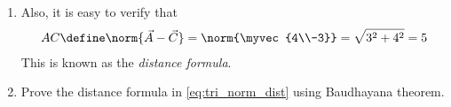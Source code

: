 \begin{enumerate}[label=\arabic*.,ref=\thesubsection.\theenumi]
\item Also, it is easy to verify that
%
\begin{align}
\label{eq:tri_norm_dist}
AC \define  \norm{\vec{A}-\vec{C}} =  \norm{\myvec{4\\-3}} = \sqrt{3^2+4^2} = 5
\end{align}
%
This is known as the {\em distance formula}.
%
\item Prove the distance formula in \eqref{eq:tri_norm_dist} using Baudhayana theorem.

\end{enumerate}
%
%
%
%
%		
%
